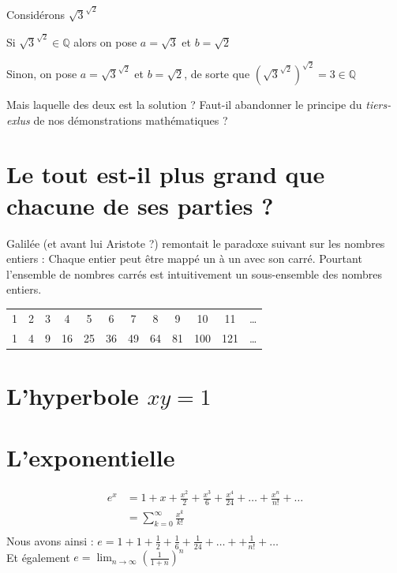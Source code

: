 Considérons $\sqrt{3}^{\sqrt{2}}$ 

Si  $\sqrt{3}^{\sqrt{2}} \in \mathbb{Q}$ alors on pose $a = \sqrt{3}$ et $b= \sqrt{2}$

Sinon, on pose $a = \sqrt{3}^{\sqrt{2}}$ et $b=\sqrt{2}$, 
de sorte que $ {(\sqrt{3}^{\sqrt{2}})}^{\sqrt{2}} = 3 \in \mathbb{Q} $


Mais laquelle des deux est la solution ?
Faut-il abandonner le principe du \textit{tiers-exlus} de nos démonstrations
mathématiques ?
\section{Le tout est-il plus grand que chacune de ses parties ?}
Galilée (et avant lui Aristote ?) remontait le paradoxe suivant sur les nombres entiers : Chaque entier peut être mappé 
un à un avec son carré. Pourtant l'ensemble de nombres carrés est intuitivement un sous-ensemble
des nombres entiers.


\begin{tabular}{cccccccccccc}
1 &2 &3 &4  &5  &6  &7  &8  &9  &10  &11  & \ldots \\  
1 &4 &9 &16 &25 &36 &49 &64 &81 &100 &121 & \ldots 
\end{tabular}

\section{L'hyperbole $xy=1$}

\section{L'exponentielle}
\begin{align*}
e^x &= 1 + x + \frac{x^2}{2} + \frac{x^3}{6} + \frac{x^4}{24} + \dots + \frac{x^n}{n!} + \dots \\
    &= \sum_{k=0}^{\infty} \frac{x^k}{k!} \\
\end{align*}
Nous avons ainsi : $e= 1+1+\frac{1}{2}+\frac{1}{6} +\frac{1}{24}+ \dots + + \frac{1}{n!} + \dots $ \\
Et également $e = \lim_{n \rightarrow \infty} (\frac{1}{1+n})^n $

